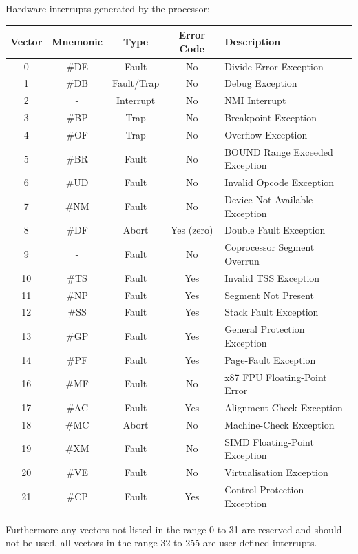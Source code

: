 \documentclass{article}
\newcommand{\layout}[1]{\parbox{\linewidth}{#1}}
\begin{document}
\layout{
  Hardware interrupts generated by the processor:
  \begin{table}[H]
    \centering
    \begin{tabular}{|c|c|c|c|l|}
      \hline \textbf{Vector} & \textbf{Mnemonic} & \textbf{Type} & \textbf{Error Code} & \textbf{Description} \\ \hline
      0 & \#DE & Fault & No & Divide Error Exception \\
      1 & \#DB & Fault/Trap & No &Debug Exception \\
      2 & - & Interrupt & No & NMI Interrupt \\
      3 & \#BP & Trap & No & Breakpoint Exception \\
      4 & \#OF & Trap & No & Overflow Exception \\
      5 & \#BR & Fault & No & BOUND Range Exceeded Exception \\
      6 & \#UD & Fault & No & Invalid Opcode Exception \\
      7 & \#NM & Fault & No & Device Not Available Exception \\
      8 & \#DF & Abort & Yes (zero) &  Double Fault Exception \\
      9 & - & Fault & No & Coprocessor Segment Overrun \\
      10 & \#TS & Fault & Yes & Invalid TSS Exception \\
      11 & \#NP & Fault & Yes & Segment Not Present \\
      12 & \#SS & Fault & Yes & Stack Fault Exception \\
      13 & \#GP & Fault & Yes & General Protection Exception \\
      14 & \#PF & Fault & Yes & Page-Fault Exception \\
      16 & \#MF & Fault & No & x87 FPU Floating-Point Error \\
      17 & \#AC & Fault & Yes & Alignment Check Exception \\
      18 & \#MC & Abort & No & Machine-Check Exception \\
      19 & \#XM & Fault & No & SIMD Floating-Point Exception \\
      20 & \#VE & Fault & No & Virtualisation Exception \\
      21 & \#CP & Fault & Yes & Control Protection Exception \\ \hline
    \end{tabular}
  \end{table}

  Furthermore any vectors not listed in the range 0 to 31 are reserved and should not be used, all vectors in the range 32 to 255 are user defined interrupts.

  \bigskip \cite[Chapter~7.3.1]{sdm3}
}
\end{document}
